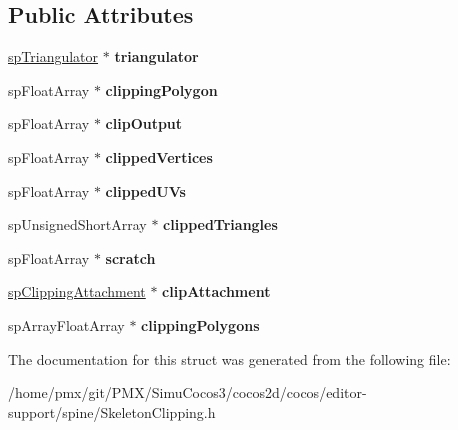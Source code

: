 \subsection*{Public Attributes}
\begin{DoxyCompactItemize}
\item 
\mbox{\label{structspSkeletonClipping_aac2079f14dfd382681c7d56999be4515}} 
\hyperlink{structspTriangulator}{sp\+Triangulator} $\ast$ {\bfseries triangulator}
\item 
\mbox{\label{structspSkeletonClipping_ac00d5e33c127d889b40cb2efb5710958}} 
sp\+Float\+Array $\ast$ {\bfseries clipping\+Polygon}
\item 
\mbox{\label{structspSkeletonClipping_a22dace62955f4d4ea5996cfaf3a01ebc}} 
sp\+Float\+Array $\ast$ {\bfseries clip\+Output}
\item 
\mbox{\label{structspSkeletonClipping_a29db8103865819ea11dbf4374d4e88c0}} 
sp\+Float\+Array $\ast$ {\bfseries clipped\+Vertices}
\item 
\mbox{\label{structspSkeletonClipping_a6fb28fab6d2594e4b805686cdb1ab472}} 
sp\+Float\+Array $\ast$ {\bfseries clipped\+U\+Vs}
\item 
\mbox{\label{structspSkeletonClipping_acedc661ee5432403224a9abaf19b0f33}} 
sp\+Unsigned\+Short\+Array $\ast$ {\bfseries clipped\+Triangles}
\item 
\mbox{\label{structspSkeletonClipping_aa2c254c4fbb26e2e0880b571fb1644a4}} 
sp\+Float\+Array $\ast$ {\bfseries scratch}
\item 
\mbox{\label{structspSkeletonClipping_a93e4637f24561b6c06d949a398a6e248}} 
\hyperlink{structspClippingAttachment}{sp\+Clipping\+Attachment} $\ast$ {\bfseries clip\+Attachment}
\item 
\mbox{\label{structspSkeletonClipping_a9948aa1ba35f4cb767647288fff5f1dc}} 
sp\+Array\+Float\+Array $\ast$ {\bfseries clipping\+Polygons}
\end{DoxyCompactItemize}


The documentation for this struct was generated from the following file\+:\begin{DoxyCompactItemize}
\item 
/home/pmx/git/\+P\+M\+X/\+Simu\+Cocos3/cocos2d/cocos/editor-\/support/spine/Skeleton\+Clipping.\+h\end{DoxyCompactItemize}
